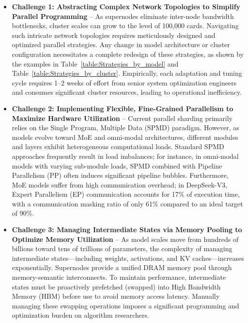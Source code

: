\documentclass[11pt]{article}
\begin{document}
\begin{itemize}
    \item \textbf{Challenge 1: Abstracting Complex Network Topologies to Simplify Parallel Programming} – As supernodes eliminate inter-node bandwidth bottlenecks, cluster scales can grow to the level of 100,000 cards. Navigating such intricate network topologies requires meticulously designed and optimized parallel strategies. Any change in model architecture or cluster configuration necessitates a complete redesign of these strategies, as shown by the examples in Table~\ref{table:Strategies_by_model} and Table~\ref{table:Strategies_by_cluster}. Empirically, each adaptation and tuning cycle requires 1–2 weeks of effort from senior system optimization engineers and consumes significant cluster resources, leading to operational inefficiency.
    
    \item \textbf{Challenge 2: Implementing Flexible, Fine-Grained Parallelism to Maximize Hardware Utilization} – Current parallel sharding primarily relies on the Single Program, Multiple Data (SPMD) paradigm. However, as models evolve toward MoE and omni-modal architectures, different modules and layers exhibit heterogeneous computational loads. Standard SPMD approaches frequently result in load imbalances; for instance, in omni-modal models with varying sub-module loads, SPMD combined with Pipeline Parallelism (PP) often induces significant pipeline bubbles. Furthermore, MoE models suffer from high communication overhead; in DeepSeek-V3, Expert Parallelism (EP) communication accounts for 17\% of execution time, with a communication masking ratio of only 61\% compared to an ideal target of 90\%.
    
    

    \item \textbf{Challenge 3: Managing Intermediate States via Memory Pooling to Optimize Memory Utilization} – As model scales move from hundreds of billions toward tens of trillions of parameters, the complexity of managing intermediate states—including weights, activations, and KV caches—increases exponentially. Supernodes provide a unified DRAM memory pool through memory-semantic interconnects. To maintain performance, intermediate states must be proactively prefetched (swapped) into High Bandwidth Memory (HBM) before use to avoid memory access latency. Manually managing these swapping operations imposes a significant programming and optimization burden on algorithm researchers.
\end{itemize}
\end{document}
